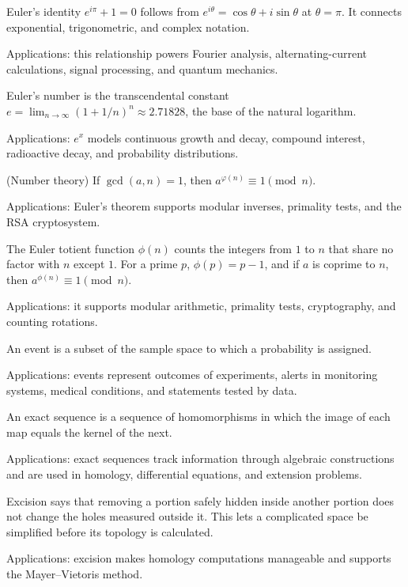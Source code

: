Euler's identity $e^{i\pi}+1=0$ follows from $e^{i\theta}=\cos\theta+i\sin\theta$ at $\theta=\pi$. It connects exponential, trigonometric, and complex notation. \par\noindent Applications: this relationship powers Fourier analysis, alternating-current calculations, signal processing, and quantum mechanics.

Euler's number is the transcendental constant $e=\lim_{n\to\infty}(1+1/n)^n\approx2.71828$, the base of the natural logarithm. \par\noindent Applications: $e^x$ models continuous growth and decay, compound interest, radioactive decay, and probability distributions.

(Number theory) If $\gcd(a,n)=1$, then $a^{\varphi(n)}\equiv1\pmod n$. \par\noindent Applications: Euler's theorem supports modular inverses, primality tests, and the RSA cryptosystem.

The Euler totient function $\phi(n)$ counts the integers from $1$ to $n$ that share no factor with $n$ except $1$. For a prime $p$, $\phi(p)=p-1$, and if $a$ is coprime to $n$, then $a^{\phi(n)}\equiv1\pmod n$. \par\noindent Applications: it supports modular arithmetic, primality tests, cryptography, and counting rotations.

An event is a subset of the sample space to which a probability is assigned. \par\noindent Applications: events represent outcomes of experiments, alerts in monitoring systems, medical conditions, and statements tested by data.

An exact sequence is a sequence of homomorphisms in which the image of each map equals the kernel of the next. \par\noindent Applications: exact sequences track information through algebraic constructions and are used in homology, differential equations, and extension problems.

Excision says that removing a portion safely hidden inside another portion does not change the holes measured outside it. This lets a complicated space be simplified before its topology is calculated. \par\noindent Applications: excision makes homology computations manageable and supports the Mayer--Vietoris method.

